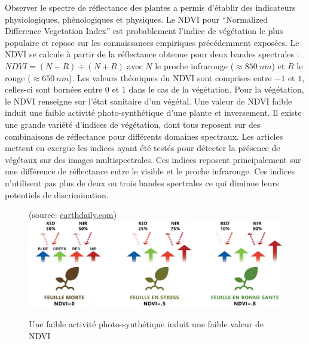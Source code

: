 \documentclass[../thesis.tex]{subfiles}
\begin{document}
    \par Observer le spectre de réflectance des plantes a permis d'établir des indicateurs physiologiques, phénologiques et physiques. Le NDVI pour ``Normalized Difference Vegetation Index'' est probablement l'indice de végétation le plus populaire et repose sur les connaissances empiriques précédemment exposées. Le NDVI se calcule à partir de la réflectance obtenue pour deux bandes spectrales : $NDVI = (N-R) \div (N+R)$ avec $N$ le proche infrarouge ($\approx \SI{850}{nm}$) et $R$ le rouge ($\approx \SI{650}{nm}$). Les valeurs théoriques du NDVI sont comprises entre $-1$ et $1$, celles-ci sont bornées entre 0 et 1 dans le cas de la végétation. Pour la végétation, le NDVI renseigne sur l'état sanitaire d'un végétal. Une valeur de NDVI faible induit une faible activité photo-synthétique d'une plante et inversement. Il existe une grande variété d'indices de végétation, dont tous reposent sur des combinaisons de réflectance pour différents domaines spectraux. Les articles \cite{pmid29997682,XueJinru,Zhang2017ImagePT} mettent en exergue les indices ayant été testés pour détecter la présence de végétaux sur des images multispectrales. Ces indices reposent principalement sur une différence de réflectance entre le visible et le proche infrarouge. Ces indices n'utilisent pas plus de deux ou trois bandes spectrales ce qui diminue leurs potentiels de discrimination.
    
    \begin{figure}[H]
        \centering
        {\scriptsize (source: \url{earthdaily.com})} \\
        \includegraphics[width=0.7\linewidth]{img/biblio/base-ndvi-empiric}
        \caption{Une faible activité photo-synthétique induit une faible valeur de NDVI}
        \label{fig:03-base-ndvi-empiric}
    \end{figure}
    
    \newpage
\end{document}
